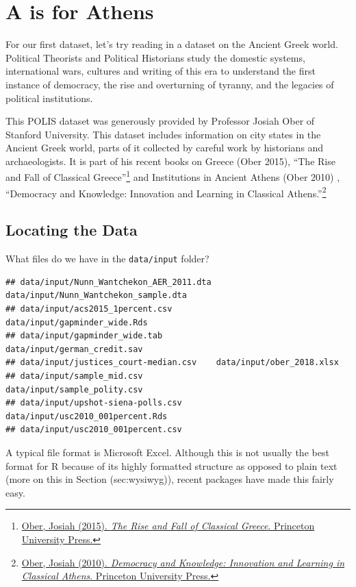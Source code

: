 \documentclass[
]{book}
\theoremstyle{definition}
\theoremstyle{definition}
\theoremstyle{definition}
\theoremstyle{definition}
\theoremstyle{remark}
\begin{document}
\hypertarget{a-is-for-athens}{%
\section{A is for Athens}\label{a-is-for-athens}}

For our first dataset, let's try reading in a dataset on the Ancient Greek world. Political Theorists and Political Historians study the domestic systems, international wars, cultures and writing of this era to understand the first instance of democracy, the rise and overturning of tyranny, and the legacies of political institutions.

This POLIS dataset was generously provided by Professor Josiah Ober of Stanford University. This dataset includes information on city states in the Ancient Greek world, parts of it collected by careful work by historians and archaeologists. It is part of his recent books on Greece (Ober 2015), ``The Rise and Fall of Classical Greece''\footnote{\href{https://press.princeton.edu/titles/10423.html}{Ober, Josiah (2015). \emph{The Rise and Fall of Classical Greece}. Princeton University Press.}} and Institutions in Ancient Athens (Ober 2010) , ``Democracy and Knowledge: Innovation and Learning in Classical Athens.''\footnote{\href{https://press.princeton.edu/titles/8742.html}{Ober, Josiah (2010). \emph{Democracy and Knowledge: Innovation and Learning in Classical Athens}. Princeton University Press.}}

\hypertarget{locating-the-data}{%
\subsection{Locating the Data}\label{locating-the-data}}

What files do we have in the \texttt{data/input} folder?

\begin{verbatim}
## data/input/Nunn_Wantchekon_AER_2011.dta data/input/Nunn_Wantchekon_sample.dta   
## data/input/acs2015_1percent.csv         data/input/gapminder_wide.Rds           
## data/input/gapminder_wide.tab           data/input/german_credit.sav            
## data/input/justices_court-median.csv    data/input/ober_2018.xlsx               
## data/input/sample_mid.csv               data/input/sample_polity.csv            
## data/input/upshot-siena-polls.csv       data/input/usc2010_001percent.Rds       
## data/input/usc2010_001percent.csv
\end{verbatim}

A typical file format is Microsoft Excel. Although this is not usually the best format for R because of its highly formatted structure as opposed to plain text (more on this in Section (sec:wysiwyg)), recent packages have made this fairly easy.
\end{document}

